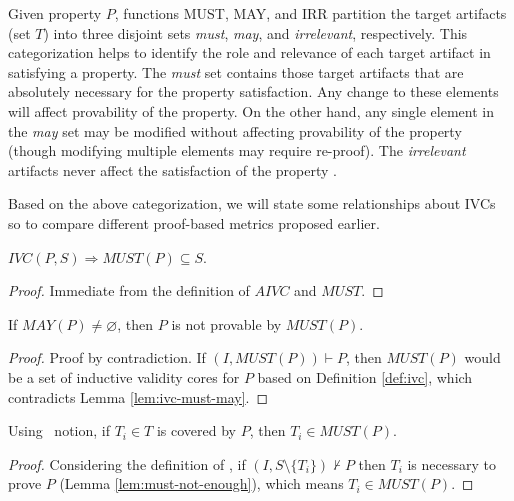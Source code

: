 Given property $P$, functions MUST, MAY, and IRR partition the target artifacts (set $T$) into three disjoint sets \emph{must}, \emph{may}, and \emph{irrelevant}, respectively. This categorization helps to identify the role and relevance of each target artifact in satisfying a property. The \emph{must} set contains those target artifacts that are absolutely necessary for the property satisfaction.  Any change to these elements will affect provability of the property. On the other hand, any single element in the \emph{may} set may be modified without affecting provability of the property (though modifying multiple elements may require re-proof).   The \emph{irrelevant} artifacts never affect the satisfaction of the property \cite{Murugesan16:renext}.

Based on the above categorization, we will state some relationships about IVCs so to compare different proof-based metrics proposed earlier.

\begin{lemma}
  \label{lem:ivc-must-may}
 $IVC(P, S) \Rightarrow  MUST(P) \subseteq S$.
\end{lemma}
\begin{proof}
 Immediate from the definition of $AIVC$ and $MUST$.
\end{proof}
\vspace{2mm}

\begin{lemma}
  \label{lem:must-not-enough}
  If $MAY(P) \neq \varnothing$, then $P$ is not provable by $MUST(P)$.
\end{lemma}
\begin{proof}
  Proof by contradiction. If $(I, MUST(P)) \vdash P$, then $MUST(P)$
  would be a set of inductive validity cores for $P$ based on Definition \ref{def:ivc},
  which contradicts Lemma \ref{lem:ivc-must-may}.
\end{proof}
\vspace{2mm}

\begin{lemma}
  \label{lem:must-coverage}
  Using \nondetcov\ notion, if $T_i \in T$ is covered by $P$, then $T_i \in MUST(P)$.
\end{lemma}
\begin{proof}
Considering the definition of \nondetcov, if
 $(I, S \setminus \{ T_i \}) \nvdash P$ then $T_i$ is necessary to prove $P$ (Lemma \ref{lem:must-not-enough}), which means $T_i \in MUST(P)$.
\end{proof}
\vspace{2mm}

